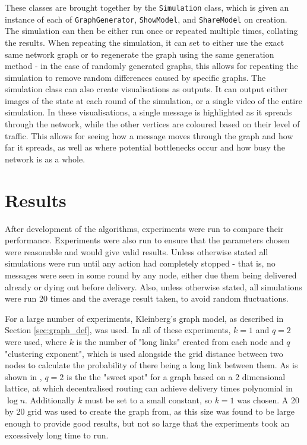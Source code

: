 \documentclass[bsc,frontabs,twoside,singlespacing,parskip,deptreport]{infthesis}     %
\begin{document}
These classes are brought together by the \texttt{Simulation} class, which is given an instance of each of \texttt{GraphGenerator}, \texttt{ShowModel}, and \texttt{ShareModel} on creation. The simulation can then be either run once or repeated multiple times, collating the results. When repeating the simulation, it can set to either use the exact same network graph or to regenerate the graph using the same generation method - in the case of randomly generated graphs, this allows for repeating the simulation to remove random differences caused by specific graphs. The simulation class can also create visualisations as outputs. It can output either images of the state at each round of the simulation, or a single video of the entire simulation. In these visualisations, a single message is highlighted as it spreads through the network, while the other vertices are coloured based on their level of traffic. This allows for seeing how a message moves through the graph and how far it spreads, as well as where potential bottlenecks occur and how busy the network is as a whole.


\chapter{Results}
After development of the algorithms, experiments were run to compare their performance. Experiments were also run to ensure that the parameters chosen were reasonable and would give valid results. Unless otherwise stated all simulations were run until any action had completely stopped - that is, no messages were seen in some round by any node, either due them being delivered already or dying out before delivery. Also, unless otherwise stated, all simulations were run 20 times and the average result taken, to avoid random fluctuations.

For a large number of experiments, Kleinberg's graph model, as described in Section \ref{sec:graph_def}, was used. In all of these experiments, $k=1$ and $q=2$ were used, where $k$ is the number of "long links" created from each node and $q$ "clustering exponent", which is used alongside the grid distance between two nodes to calculate the probability of there being a long link between them. As is shown in \cite{Kleinberg00},  $q=2$ is the the "sweet spot" for a graph based on a 2 dimensional lattice, at which decentralised routing can achieve delivery times polynomial in $\log n$. Additionally $k$ must be set to a small constant, so $k=1$ was chosen. A 20 by 20 grid was used to create the graph from, as this size was found to be large enough to provide good results, but not so large that the experiments took an excessively long time to run.
\end{document}
